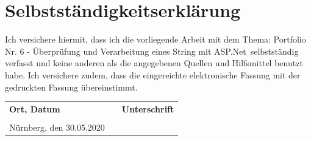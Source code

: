\documentclass[a4paper,
12pt,
oneside]
{article}
\begin{document}
	
	
	\section*{Selbstständigkeitserklärung}
	Ich versichere hiermit, dass ich die vorliegende Arbeit mit dem Thema: \glqq Portfolio Nr. 6 - Überprüfung und Verarbeitung eines String mit ASP.Net\grqq~selbstständig verfasst und keine anderen als die angegebenen Quellen und Hilfsmittel benutzt habe. Ich versichere zudem, dass die eingereichte elektronische Fassung mit der gedruckten Fassung übereinstimmt.\\
	
	\begin{table}[b]
		\begin{tabular}{p{} p{} p{}}
			\textbf{Ort, Datum} & & \textbf{Unterschrift} \\
			& & \\
			Nürnberg, den 30.05.2020 & & 
		\end{tabular}
	\end{table}
	
\end{document}
